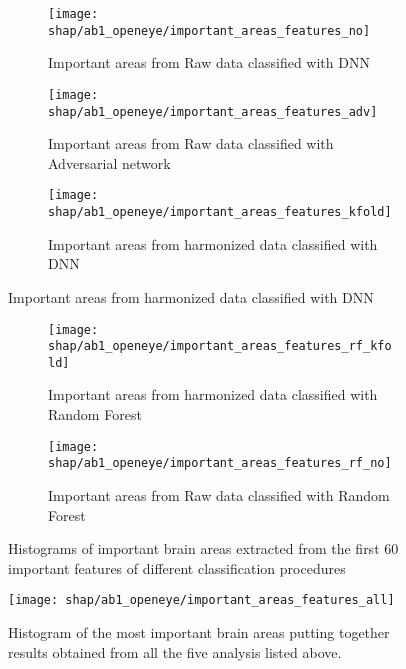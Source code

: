 \documentclass[11pt]{report}
\begin{document}
\begin{figure}
\centering
\begin{subfigure}[b]{1\columnwidth}
   \texttt{[image: shap/ab1\_openeye/important\_areas\_features\_no]}
   \caption{Important areas from Raw data classified with DNN}
   \label{}
\end{subfigure}

\begin{subfigure}[b]{1\columnwidth}
   \texttt{[image: shap/ab1\_openeye/important\_areas\_features\_adv]}
   \caption{Important areas from Raw data classified with Adversarial network}
   \label{}
\end{subfigure}

\begin{subfigure}[b]{1\columnwidth}
   \texttt{[image: shap/ab1\_openeye/important\_areas\_features\_kfold]}
   \caption{Important areas from harmonized data classified with DNN}
   \label{}
\end{subfigure}
\end{figure}
\begin{figure}\ContinuedFloat
\begin{subfigure}[b]{1\columnwidth}
   \texttt{[image: shap/ab1\_openeye/important\_areas\_features\_rf\_kfold]}
   \caption{Important areas from harmonized data classified with Random Forest}
   \label{}
\end{subfigure}

\begin{subfigure}[b]{1\columnwidth}
   \texttt{[image: shap/ab1\_openeye/important\_areas\_features\_rf\_no]}
   \caption{Important areas from Raw data classified with Random Forest}
   \label{}
\end{subfigure}
\caption{Histograms of important brain areas extracted from the first 60 important features of different classification procedures}
\label{fig:histograms_60_ab1_openeye}
\end{figure}


\begin{figure}[h]
\centering
  \texttt{[image: shap/ab1\_openeye/important\_areas\_features\_all]}
\caption{Histogram of the most important brain areas putting together results obtained from all the five analysis listed above.}
\label{fig:important_areas_features_all_ab1_openeye}
\end{figure}

\newpage



\end{document}
